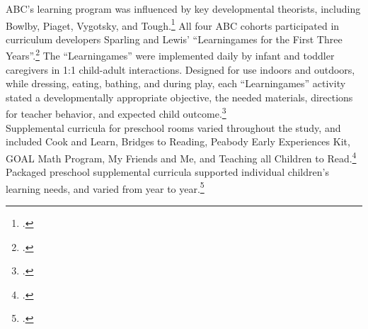 \noindent ABC's learning program was influenced by key developmental theorists, including Bowlby, Piaget, Vygotsky, and Tough.\footnote{\citet{Sparling_1974_Synth_Edu_Infant_SPEECH,Mcginness_1981_Developing,abc2014-2015interviews}.} All four ABC cohorts participated in curriculum developers Sparling and Lewis' ``Learningames for the First Three Years''.\footnote{ \citet{Sparling_Lewis_1979_BOOKLearninggamesFirstThree}.} The ``Learningames'' were implemented daily by infant and toddler caregivers in 1:1 child-adult interactions. Designed for use indoors and outdoors, while dressing, eating, bathing, and during play, each ``Learningames'' activity stated a developmentally appropriate objective, the needed materials, directions for teacher behavior, and expected child outcome.\footnote{\citet{Ramey_Campbell_1979_SR, Ramey_1981_Modification,Sparling_Lewis_1979_BOOKLearninggamesFirstThree}.}\\

\noindent Supplemental curricula for preschool rooms varied throughout the study, and included Cook and Learn, Bridges to Reading, Peabody Early Experiences Kit, GOAL Math Program, My Friends and Me, and Teaching all Children to Read.\footnote{ \citet{Greenberg_Epstein_1973_BOOKBridgestoreading,Karnes1973,Dunn_Chun_etal_1976_BOOKPeabodyearlyeducation,Davis_1977_BOOKMyfriends,Wallach_1976_Teaching-All-Children}.} Packaged preschool supplemental curricula supported individual children's learning needs, and varied from year to year.\footnote{ \citet{Ramey_McGinness_etal_1982_Abecedarianapproach,Mcginness_1981_Developing,Finkelstein_1982_Day_Care_YC,Wasik_Ramey_etal_1990_CD}.}\\

